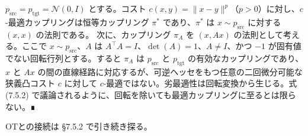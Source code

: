 \begin{propositionbox}[例：直線カップリングは最適である必要がない]
$p_{\mathrm{src}} = p_{\mathrm{tgt}} = \mathcal{N}(0, I)$ とする。コスト $c(x, y) = \|x - y\|^p$（$p > 0$）に対し、$c$-最適カップリングは恒等カップリング $\pi^*$ であり、$\pi^*$ は $x \sim p_{\mathrm{src}}$ に対する $(x, x)$ の法則である。
次に、カップリング $\pi_A$ を $(x, Ax)$ の法則として考える。ここで $x \sim p_{\mathrm{src}}$、$A$ は $A^\top A = I$、$\det(A) = 1$、$A \ne I$、かつ $-1$ が固有値でない回転行列とする。すると $\pi_A$ は $p_{\mathrm{src}}$ と $p_{\mathrm{tgt}}$ の有効なカップリングであり、$x$ と $Ax$ の間の直線経路に対応するが、可逆ヘッセをもつ任意の二回微分可能な狭義凸コスト $c$ に対して $c$-最適ではない。劣最適性は回転変換から生じる。式 (7.5.2) で議論されるように、回転を除いても最適カップリングに至るとは限らない。∎
\end{propositionbox}


OTとの接続は §7.5.2 で引き続き探る。

